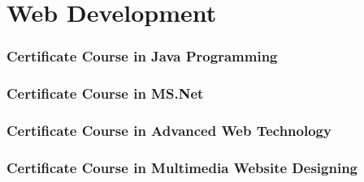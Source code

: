 \section{Web Development}
\begin{frame}
	\frametitle{Certificate Course in Java Programming}
\end{frame}
\begin{frame}
	\frametitle{Certificate Course in MS.Net}
\end{frame}
\begin{frame}
	\frametitle{Certificate Course in Advanced Web Technology}
\end{frame}
\begin{frame}
	\frametitle{ {\large Certificate Course in Multimedia Website Designing}}
\end{frame}